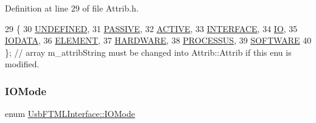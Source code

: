 Definition at line 29 of file Attrib.\+h.


\begin{DoxyCode}
29                 \{
30     \hyperlink{classAttrib_a69e171d7cc6417835a5a306d3c764235a3a8da2ab97dda18aebab196fe4100531}{UNDEFINED},
31     \hyperlink{classAttrib_a69e171d7cc6417835a5a306d3c764235a2bfb2af57b87031d190a05fe25dd92ed}{PASSIVE},
32     \hyperlink{classAttrib_a69e171d7cc6417835a5a306d3c764235a3b1fec929c0370d1436f2f06e298fb0d}{ACTIVE},
33     \hyperlink{classAttrib_a69e171d7cc6417835a5a306d3c764235aa27c16b480a369ea4d18b07b2516bbc7}{INTERFACE},
34     \hyperlink{classAttrib_a69e171d7cc6417835a5a306d3c764235a1420a5b8c0540b2af210b6975eded7f9}{IO},
35     \hyperlink{classAttrib_a69e171d7cc6417835a5a306d3c764235a0af3b0d0ac323c1704e6c69cf90add28}{IODATA},
36     \hyperlink{classAttrib_a69e171d7cc6417835a5a306d3c764235a7788bc5dd333fd8ce18562b269c9dab1}{ELEMENT},
37     \hyperlink{classAttrib_a69e171d7cc6417835a5a306d3c764235a61ceb22149f365f1780d18f9d1459423}{HARDWARE},
38     \hyperlink{classAttrib_a69e171d7cc6417835a5a306d3c764235a75250e29692496e73effca2c0330977f}{PROCESSUS},
39     \hyperlink{classAttrib_a69e171d7cc6417835a5a306d3c764235a103a67cd0b8f07ef478fa45d4356e27b}{SOFTWARE} 
40   \}; \textcolor{comment}{// array m\_attribString must be changed into Attrib::Attrib if this enu is modified. }
\end{DoxyCode}
\mbox{\label{classUsbFTMLInterface_a181227ebb27454964e5b6d185432498d}} 
\subsubsection{\texorpdfstring{I\+O\+Mode}{IOMode}}
{\footnotesize\ttfamily enum \hyperlink{classUsbFTMLInterface_a181227ebb27454964e5b6d185432498d}{Usb\+F\+T\+M\+L\+Interface\+::\+I\+O\+Mode}}

